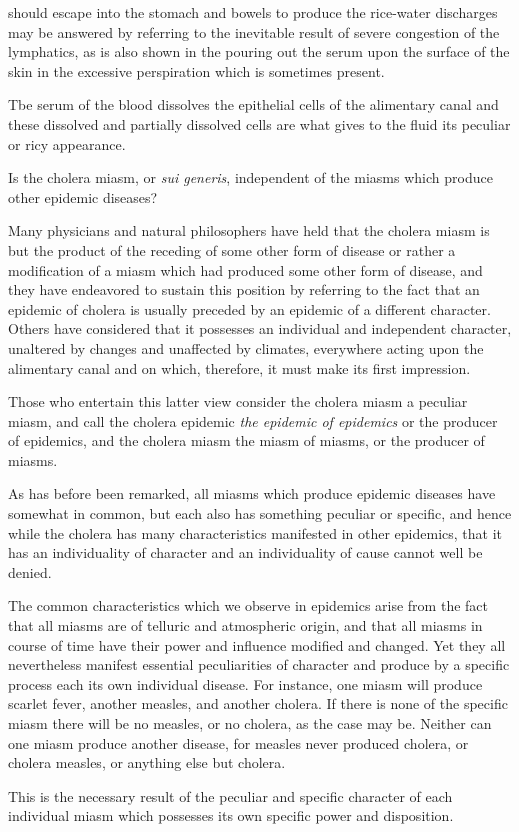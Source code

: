 should escape into the stomach and bowels to produce the rice-water
discharges may be answered by referring to the inevitable result of severe
congestion of the lymphatics, as is also shown in the pouring out the
serum upon the surface of the skin in the excessive perspiration which
is sometimes present.

Tbe serum of the blood dissolves the epithelial cells of the alimentary
canal and these dissolved and partially dissolved cells are what gives to
the fluid its peculiar or ricy appearance.

\vspace{\baselineskip}

Is the cholera miasm, or \emph{sui generis}, independent of the miasms which
produce other epidemic diseases?

Many physicians and natural philosophers have held that the cholera
miasm is but the product of the receding of some other form of disease
or rather a modification of a miasm which had produced some other
form of disease, and they have endeavored to sustain this position by
referring to the fact that an epidemic of cholera is usually preceded by
an epidemic of a different character. Others have considered that it
possesses an individual and independent character, unaltered by changes
and unaffected by climates, everywhere acting upon the alimentary canal
and on which, therefore, it must make its first impression.

Those who entertain this latter view consider the cholera miasm a
peculiar miasm, and call the cholera epidemic \emph{the epidemic of epidemics}
or the producer of epidemics, and the cholera miasm the miasm of
miasms, or the producer of miasms.

As has before been remarked, all miasms which produce epidemic
diseases have somewhat in common, but each also has something peculiar
or specific, and hence while the cholera has many characteristics
manifested in other epidemics, that it has an individuality of character
and an individuality of cause cannot well be denied.

The common characteristics which we observe in epidemics arise
from the fact that all miasms are of telluric and atmospheric origin,
and that all miasms in course of time have their power and influence
modified and changed. Yet they all nevertheless manifest essential
peculiarities of character and produce by a specific process each its own
individual disease. For instance, one miasm will produce scarlet fever,
another measles, and another cholera. If there is none of the specific
miasm there will be no measles, or no cholera, as the case may be.
Neither can one miasm produce another disease, for measles never produced
cholera, or cholera measles, or anything else but cholera.

This is the necessary result of the peculiar and specific character of
each individual miasm which possesses its own specific power and disposition.